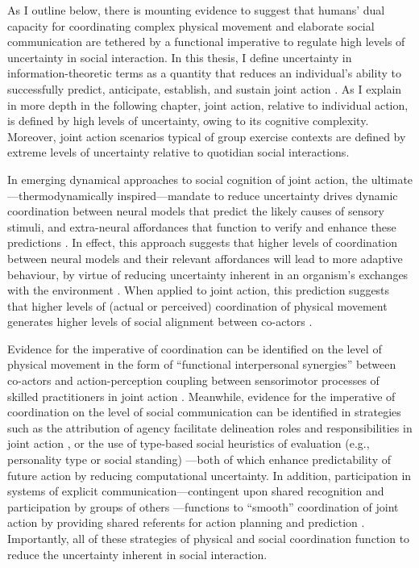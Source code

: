 \begin{CJK}{UTF8}{gbsn}
As I outline below, there is mounting evidence to suggest that humans' dual capacity for coordinating complex physical movement and elaborate social communication are tethered by a functional imperative to regulate high levels of uncertainty in social interaction.  In this thesis, I define uncertainty in information-theoretic terms as a quantity that reduces an individual's ability to successfully predict, anticipate, establish, and sustain joint action \citep{Shannon1963}.  As I explain in more depth in the following chapter, joint action, relative to individual action, is defined by high levels of uncertainty, owing to its cognitive complexity.  Moreover, joint action scenarios typical of group exercise contexts are defined by extreme levels of uncertainty relative to quotidian social interactions.

In emerging dynamical approaches to social cognition of joint action, the ultimate---thermodynamically inspired---mandate to reduce uncertainty drives dynamic coordination between neural models that predict the likely causes of sensory stimuli,  and extra-neural affordances that function to verify and enhance these predictions \citep{Friston2015,Ramstead2016}.  In effect, this approach suggests that higher levels of coordination between neural models and their relevant affordances will lead to more adaptive behaviour, by virtue of reducing uncertainty inherent in an organism's exchanges with the environment \citep{Firston2010,Ramstead2017}.  When applied to joint action, this prediction suggests that higher levels of (actual or perceived) coordination of physical movement generates higher levels of social alignment between co-actors \citep[]{Semin2008,Wheatley2012}.

Evidence for the imperative of coordination can be identified on the level of physical movement in the form of ``functional interpersonal synergies'' \citep{Riley2011} between co-actors and action-perception coupling between sensorimotor processes of skilled practitioners in joint action \citep{Novembre2014}.  Meanwhile, evidence for the imperative of coordination on the level of social communication can be identified in strategies such as the attribution of agency facilitate delineation roles and responsibilities in joint action \citep{Wolpert2003,Sato2008,VanderWel2012VanderWel2012}, or the use of type-based social heuristics of evaluation (e.g., personality type or social standing) \citep{Moutoussis2014}---both of which enhance predictability of future action by reducing computational uncertainty.
In addition, participation in systems of explicit communication---contingent upon shared recognition and participation by groups of others \citep{Ramstead2016}---functions to ``smooth'' coordination of joint action by providing shared referents for action planning and prediction \citep{Vesper2017}.
Importantly, all of these strategies of physical and social coordination function to reduce the uncertainty inherent in social interaction.


\end{CJK}
